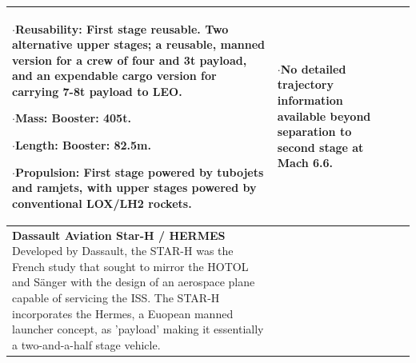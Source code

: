 {\begin{landscape}
\begin{xltabular}{\linewidth}{|X|X|X|}
	$\cdot$\textbf{Reusability:} First stage reusable. Two alternative upper stages; a reusable, manned version for a crew of four and 3t payload, and an expendable cargo version for carrying 7-8t payload to LEO. 
	
	$\cdot$\textbf{Mass:} Booster: 405t. 
	
	$\cdot$\textbf{Length:} Booster: 82.5m.
	
	$\cdot$\textbf{Propulsion:} First stage powered by tubojets and ramjets, with upper stages powered by conventional LOX/LH2 rockets. 
	
	&\small
	$\cdot$No detailed trajectory information available beyond separation to second stage at Mach 6.6. 
	\\
	\hline \small 
	\textbf{Dassault Aviation Star-H / HERMES} \cite{Aberleen}\newline\newline
Developed by Dassault, the STAR-H was the French study that sought to mirror the HOTOL and S{\"a}nger with the design of an aerospace plane capable of servicing the ISS. The STAR-H incorporates the Hermes, a Euopean manned launcher concept, as 'payload' making it essentially a two-and-a-half stage vehicle. 
	
	
	&\small
{}


\end{xltabular}
\end{landscape}}
